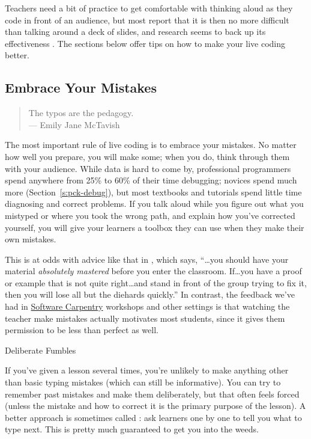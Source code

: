 Teachers need a bit of practice to get comfortable with thinking aloud
as they code in front of an audience, but most report that it is then no
more difficult than talking around a deck of slides, and research seems
to back up its effectiveness \cite{Rubi2013,Haar2017}. The sections
below offer tips on how to make your live coding better.

\subsection*{Embrace Your Mistakes}

\begin{quote}

  The typos are the pedagogy. \\
  --- Emily Jane McTavish

\end{quote}

The most important rule of live coding is to embrace your mistakes. No
matter how well you prepare, you will make some; when you do, think
through them with your audience. While data is hard to come by,
professional programmers spend anywhere from 25\% to 60\% of their time
debugging; novices spend much more (Section~\ref{s:pck-debug}), but most
textbooks and tutorials spend little time diagnosing and correct
problems. If you talk aloud while you figure out what you mistyped or
where you took the wrong path, and explain how you've corrected
yourself, you will give your learners a toolbox they can use when they
make their own mistakes.

This is at odds with advice like that in \cite{Kran2015}, which
says, ``\ldots{}you should have your material \emph{absolutely mastered} before
you enter the classroom. If\ldots{}you have a proof or example that is not
quite right\ldots{}and stand in front of the group trying to fix it, then
you will lose all but the diehards quickly.'' In contrast, the feedback
we've had in \href{http://software-carpentry.org}{Software Carpentry} workshops and other settings is
that watching the teacher make mistakes actually motivates most
students, since it gives them permission to be less than perfect as
well.

\begin{aside}{Deliberate Fumbles}

If you've given a lesson several times, you're unlikely to make
anything other than basic typing mistakes (which can still be
informative). You can try to remember past mistakes and make them
deliberately, but that often feels forced (unless the mistake and
how to correct it is the primary purpose of the lesson). A better
approach is sometimes called : ask
learners one by one to tell you what to type next. This is pretty
much guaranteed to get you into the weeds.

\end{aside}

